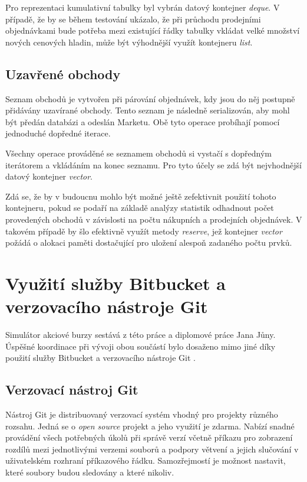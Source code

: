 \documentclass[thesis=M,czech]{FITthesis}[2012/06/26]
\begin{document}
Pro reprezentaci kumulativní tabulky byl vybrán datový kontejner \textit{deque}. V případě, že by se během testování ukázalo, 
že při průchodu prodejními objednávkami bude potřeba mezi existující řádky tabulky vkládat velké množství nových cenových 
hladin, může být výhodnější využít kontejneru \textit{list}.


\subsection{Uzavřené obchody}

Seznam obchodů je vytvořen při párování objednávek, kdy jsou do něj postupně přidávány uzavírané obchody. Tento 
seznam je následně serializován, aby mohl být předán databázi a odeslán Marketu. Obě tyto operace probíhají pomocí 
jednoduché dopředné iterace.

Všechny operace prováděné se seznamem obchodů si vystačí s dopředným iterátorem a vkládáním na konec seznamu. 
Pro tyto účely se zdá být nejvhodnější datový kontejner \textit{vector}. 

Zdá se, že by v budoucnu mohlo být možné ještě zefektivnit použití tohoto kontejneru, pokud se podaří na základě 
analýzy statistik odhadnout počet provedených obchodů v závislosti na počtu nákupních a prodejních objednávek.
V takovém případě by šlo efektivně využít metody \textit{reserve}, jež kontejner \textit{vector} požádá o alokaci paměti 
dostačující pro uložení alespoň zadaného počtu prvků.


\section{Využití služby Bitbucket a verzovacího nástroje Git}

Simulátor akciové burzy sestává z této práce a diplomové práce Jana Jůny. Úspěšné koordinace při 
vývoji obou součástí bylo dosaženo mimo jiné díky použití služby Bitbucket \cite{bitbucket} a verzovacího nástroje Git
\cite{git}. 


\subsection{Verzovací nástroj Git}

Nástroj Git je distribuovaný verzovací systém vhodný pro projekty různého rozsahu. Jedná se o \textit{open source} projekt 
a jeho využití je zdarma. Nabízí snadné provádění všech potřebných úkolů při správě verzí včetně příkazu pro zobrazení rozdílů 
mezi jednotlivými verzemi souborů a podpory větvení a jejich slučování v uživatelském rozhraní příkazového řádku. Samozřejmostí je 
možnost nastavit, které soubory budou sledovány a které nikoliv.
\end{document}
